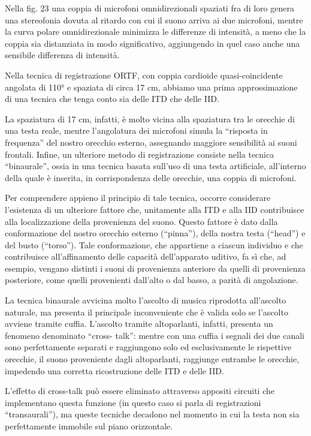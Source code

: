 Nella fig. 23 una coppia di microfoni omnidirezionali spaziati fra di loro genera
una stereofonia dovuta al ritardo con cui il suono arriva ai due microfoni,
mentre la curva polare omnidirezionale minimizza le differenze di intensità, a
meno che la coppia sia distanziata in modo significativo, aggiungendo in quel
caso anche una sensibile differenza di intensità.

Nella tecnica di registrazione ORTF, con coppia cardioide quasi-coincidente
angolata di 110° e spaziata di circa 17 cm, abbiamo una prima approssimazione
di una tecnica che tenga conto sia delle ITD che delle IID.

La spaziatura di 17 cm, infatti, è molto vicina alla spaziatura tra le orecchie
di una testa reale, mentre l’angolatura dei microfoni simula la “risposta in frequenza”
del nostro orecchio esterno, assegnando maggiore sensibilità ai suoni frontali.
Infine, un ulteriore metodo di registrazione consiste nella tecnica “binaurale”,
ossia in una tecnica basata sull’uso di una testa artificiale, all’interno della
quale è inserita, in corrispondenza delle orecchie, una coppia di microfoni.

Per comprendere appieno il principio di tale tecnica, occorre considerare
l’esistenza di un ulteriore fattore che, unitamente alla ITD e alla IID
contribuisce alla localizzazione della provenienza del suono. Questo fattore è
dato dalla conformazione del nostro orecchio esterno (“pinna”), della nostra testa
(“head”) e del busto (“torso”). Tale conformazione, che appartiene a ciascun
individuo e che contribuisce all’affinamento delle capacità dell’apparato uditivo,
fa sì che, ad esempio, vengano distinti i suoni di provenienza anteriore da
quelli di provenienza posteriore, come quelli provenienti dall’alto o dal basso,
a parità di angolazione.

La tecnica binaurale avvicina molto l’ascolto di musica riprodotta all’ascolto
naturale, ma presenta il principale inconveniente che è valida solo se l’ascolto
avviene tramite cuffia. L’ascolto tramite altoparlanti, infatti, presenta un
fenomeno denominato “cross- talk”: mentre con una cuffia i segnali dei due canali
sono perfettamente separati e raggiungono solo ed esclusivamente le rispettive
orecchie, il suono proveniente dagli altoparlanti, raggiunge entrambe le orecchie,
impedendo una corretta ricostruzione delle ITD e delle IID.

L’effetto di cross-talk può essere eliminato attraverso appositi circuiti che
implementano questa funzione (in questo caso si parla di registrazioni “transaurali”),
ma queste tecniche decadono nel momento in cui la testa non sia perfettamente
immobile sul piano orizzontale.
